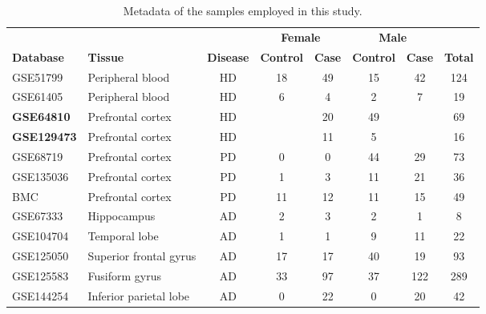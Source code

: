 \begin{table}[!ht]
\centering
\small
\caption{Metadata of the samples employed in this study.}
\label{tab:samples}
\begin{tabular}{llcccccc}
\textbf{} &
  \textbf{} &
  \multicolumn{1}{l}{\textbf{}} &
  \multicolumn{2}{c}{\textbf{Female}} &
  \multicolumn{2}{c}{\textbf{Male}} &
  \multicolumn{1}{l}{\textbf{}} \\ \cline{4-7}
\textbf{Database} &
  \textbf{Tissue} &
  \multicolumn{1}{l}{\textbf{Disease}} &
  \multicolumn{1}{l}{\textbf{Control}} &
  \multicolumn{1}{l}{\textbf{Case}} &
  \multicolumn{1}{l}{\textbf{Control}} &
  \multicolumn{1}{l}{\textbf{Case}} &
  \multicolumn{1}{l}{\textbf{Total}} \\ \hline
GSE51799                                           & Peripheral   blood       & HD & 18 & 49 & 15 & 42  & 124                  \\
GSE61405                                           & Peripheral   blood       & HD & 6  & 4  & 2  & 7   & 19                   \\
\textbf{GSE64810}                                           & Prefrontal   cortex      & HD &  & 20 & 49 &              & 69 \\
\textbf{GSE129473}                                          & Prefrontal   cortex      & HD &  & 11  & 5  &             & 16  \\
GSE68719                                           & Prefrontal   cortex      & PD & 0  & 0  & 44 & 29  & 73                   \\
GSE135036                                          & Prefrontal   cortex      & PD & 1  & 3  & 11 & 21  & 36                   \\
BMC \cite{BMC-PD}     & Prefrontal   cortex      & PD & 11 & 12 & 11 & 15  & 49                   \\
GSE67333	& Hippocampus &	AD &	2 &	3 &	2 &	1 &	8 \\
GSE104704                                          & Temporal   lobe          & AD & 1  & 1  & 9  & 11  & 22                   \\
GSE125050                                          & Superior   frontal gyrus & AD & 17 & 17 & 40 & 19  & 93                   \\
GSE125583                                          & Fusiform   gyrus         & AD & 33 & 97 & 37 & 122 & 289                  \\
GSE144254                                          & Inferior   parietal lobe & AD & 0  & 22 & 0  & 20  & 42                   \\

\end{tabular}
\end{table}
